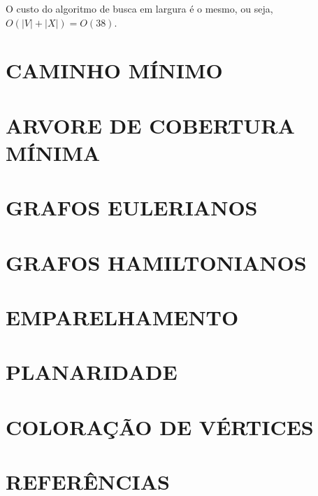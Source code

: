 O custo do algoritmo de busca em largura é o mesmo, ou seja, $ O(|V| + |X|) = O(38) $.


\chapter{CAMINHO MÍNIMO}\label{cap:caminhoMinimo}


\chapter{ARVORE DE COBERTURA MÍNIMA}\label{cap:arvCobMinima}


\chapter{GRAFOS EULERIANOS}\label{cap:grafosEulerianos}


\chapter{GRAFOS HAMILTONIANOS}\label{cap:grafosHamiltonianos}


\chapter{EMPARELHAMENTO}\label{cap:emparelhamento}


\chapter{PLANARIDADE}\label{cap:planaridade}


\chapter{COLORAÇÃO DE VÉRTICES}\label{cap:coloracaoVertices}


\clearpage
\chapter*{REFERÊNCIAS}
\vspace{-0.5em}
\nocite{*}
\printbibliography[heading=none]


